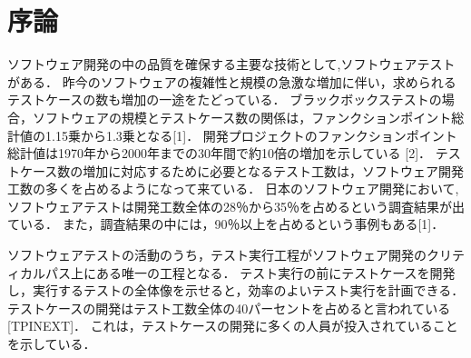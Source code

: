 \documentclass[a4paper,12pt]{jreport}
\begin{document}
\chapter{序論}
ソフトウェア開発の中の品質を確保する主要な技術として,ソフトウェアテストがある．
昨今のソフトウェアの複雑性と規模の急激な増加に伴い，求められるテストケースの数も増加の一途をたどっている．
ブラックボックステストの場合，ソフトウェアの規模とテストケース数の関係は，ファンクションポイント総計値の1.15乗から1.3乗となる[1]．
開発プロジェクトのファンクションポイント総計値は1970年から2000年までの30年間で約10倍の増加を示している [2]．
テストケース数の増加に対応するために必要となるテスト工数は，ソフトウェア開発工数の多くを占めるようになって来ている．
日本のソフトウェア開発において,ソフトウェアテストは開発工数全体の28％から35％を占めるという調査結果が出ている．
また，調査結果の中には，90％以上を占めるという事例もある[1]．

ソフトウェアテストの活動のうち，テスト実行工程がソフトウェア開発のクリティカルパス上にある唯一の工程となる．
テスト実行の前にテストケースを開発し，実行するテストの全体像を示せると，効率のよいテスト実行を計画できる．
テストケースの開発はテスト工数全体の40パーセントを占めると言われている[TPINEXT]．
これは，テストケースの開発に多くの人員が投入されていることを示している．
\end{document}
